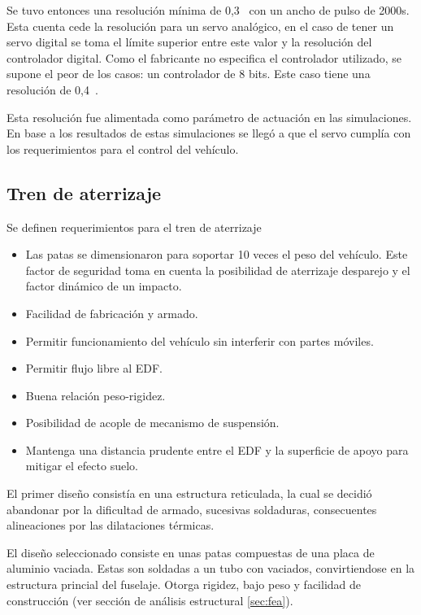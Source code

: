 Se tuvo entonces una resolución mínima de 0,3\grad~ con un ancho de pulso de 2000\micro s. Esta cuenta cede la resolución para un servo analógico, en el caso de tener un servo digital se toma el límite superior entre este valor y la resolución del controlador digital. Como el fabricante no especifica el controlador utilizado, se supone el peor de los casos: un controlador de 8 bits. Este caso tiene una resolución de 0,4\grad~.

Esta resolución fue alimentada como parámetro de actuación en las simulaciones. En base a los resultados de estas simulaciones se llegó a que el servo cumplía con los requerimientos para el control del vehículo. 

\subsection{Tren de aterrizaje}
Se definen requerimientos para el tren de aterrizaje
\begin{itemize}
    \item Las patas se dimensionaron para soportar 10 veces el peso del vehículo. Este factor de seguridad toma en cuenta la posibilidad de aterrizaje desparejo y el factor dinámico de un impacto. %
    \item Facilidad de fabricación y armado.
    \item Permitir funcionamiento del vehículo sin interferir con partes móviles.
    \item Permitir flujo libre al EDF.
    \item Buena relación peso-rigidez.
    \item Posibilidad de acople de mecanismo de suspensión.
    \item Mantenga una distancia prudente entre el EDF y la superficie de apoyo para mitigar el efecto suelo.
\end{itemize}

El primer diseño consistía en una estructura reticulada, la cual se decidió abandonar por la dificultad de armado, sucesivas soldaduras, consecuentes alineaciones por las dilataciones térmicas.

\medskip

El diseño seleccionado consiste en unas patas compuestas de una placa de aluminio vaciada. Estas son soldadas a un tubo con vaciados, convirtiendose en la estructura princial del fuselaje. Otorga rigidez, bajo peso y facilidad de construcción (ver sección de análisis estructural \ref{sec:fea}).

